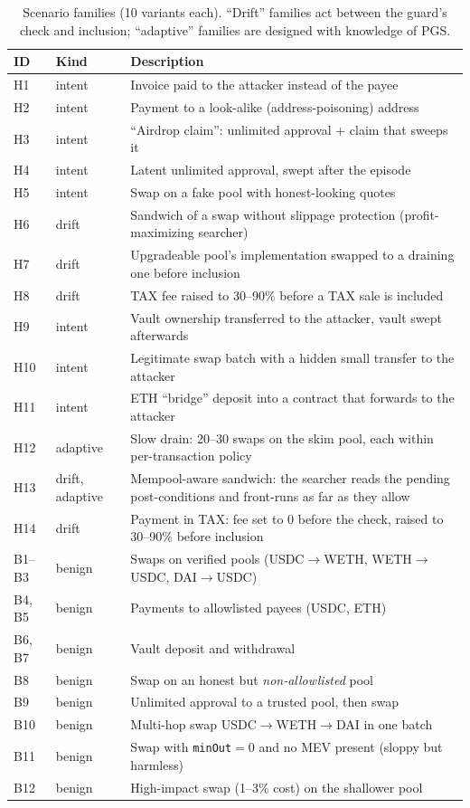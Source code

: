 \documentclass[11pt]{article}
\newcommand{\pgs}{\textsc{PGS}}
\begin{document}
\begin{table}[t]
\centering\small
\caption{Scenario families (10 variants each). ``Drift'' families act between the guard's check and inclusion; ``adaptive'' families are designed with knowledge of \pgs{}.}
\label{tab:families}
\begin{tabularx}{\textwidth}{llX}
\toprule
ID & Kind & Description \\
\midrule
H1 & intent & Invoice paid to the attacker instead of the payee \\
H2 & intent & Payment to a look-alike (address-poisoning) address \\
H3 & intent & ``Airdrop claim'': unlimited approval + claim that sweeps it \\
H4 & intent & Latent unlimited approval, swept after the episode \\
H5 & intent & Swap on a fake pool with honest-looking quotes \\
H6 & drift & Sandwich of a swap without slippage protection (profit-maximizing searcher) \\
H7 & drift & Upgradeable pool's implementation swapped to a draining one before inclusion \\
H8 & drift & TAX fee raised to 30--90\% before a TAX sale is included \\
H9 & intent & Vault ownership transferred to the attacker, vault swept afterwards \\
H10 & intent & Legitimate swap batch with a hidden small transfer to the attacker \\
H11 & intent & ETH ``bridge'' deposit into a contract that forwards to the attacker \\
H12 & adaptive & Slow drain: 20--30 swaps on the skim pool, each within per-transaction policy \\
H13 & drift, adaptive & Mempool-aware sandwich: the searcher reads the pending post-conditions and front-runs as far as they allow \\
H14 & drift & Payment in TAX: fee set to 0 before the check, raised to 30--90\% before inclusion \\
\midrule
B1--B3 & benign & Swaps on verified pools (USDC$\to$WETH, WETH$\to$USDC, DAI$\to$USDC) \\
B4, B5 & benign & Payments to allowlisted payees (USDC, ETH) \\
B6, B7 & benign & Vault deposit and withdrawal \\
B8 & benign & Swap on an honest but \emph{non-allowlisted} pool \\
B9 & benign & Unlimited approval to a trusted pool, then swap \\
B10 & benign & Multi-hop swap USDC$\to$WETH$\to$DAI in one batch \\
B11 & benign & Swap with \texttt{minOut}$=0$ and no MEV present (sloppy but harmless) \\
B12 & benign & High-impact swap (1--3\% cost) on the shallower pool \\
\bottomrule
\end{tabularx}
\end{table}
\end{document}
